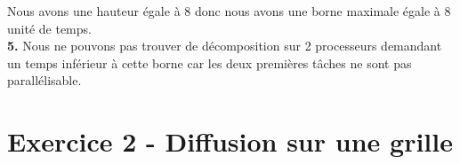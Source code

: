 \documentclass{article}
\begin{document}
Nous avons une hauteur \'egale \`a 8 donc nous avons une borne maximale \'egale \`a 8 unit\'e de temps.\\

\smallskip
\textbf{5.} Nous ne pouvons pas trouver de d\'ecomposition sur 2 processeurs demandant un temps inf\'erieur \`a cette borne car les deux premi\`eres t\^aches ne sont pas parall\'elisable.\\

\section*{Exercice 2 - Diffusion sur une grille}\label{sec:name}
\end{document}
